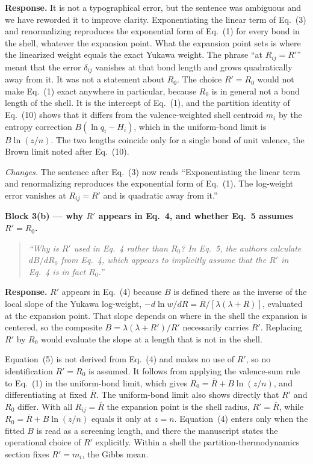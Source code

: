 \documentclass[11pt]{article}
\newenvironment{refquote}%
  {\begin{quote}\itshape\color{black!70}}%
  {\end{quote}}
\begin{document}
\textbf{Response.}  It is not a typographical error, but the sentence
was ambiguous and we have reworded it to improve clarity.  Exponentiating the linear
term of Eq.~(3) and renormalizing reproduces the exponential form of
Eq.~(1) for every bond in the shell, whatever the expansion point.
What the expansion point sets is where the linearized weight equals
the exact Yukawa weight.  The phrase ``at $R_{ij}=R'$'' meant that
the error $\delta_{ij}$ vanishes at that bond length and grows
quadratically away from it.  It was not a statement about $R_0$.
The choice $R'=R_0$ would not make Eq.~(1) exact anywhere in
particular, because $R_0$ is in general not a bond length of the
shell.  It is the intercept of Eq.~(1), and the partition identity of
Eq.~(10) shows that it differs from the valence-weighted shell
centroid $m_i$ by the entropy correction $B(\ln q_i-H_i)$, which in
the uniform-bond limit is $B\ln(z/n)$.  The two lengths coincide
only for a single bond of unit valence, the Brown limit noted after
Eq.~(10).

\emph{Changes.}  The sentence after Eq.~(3) now reads
``Exponentiating the linear term and renormalizing reproduces the
exponential form of Eq.~(1).  The log-weight error vanishes at
$R_{ij}=R'$ and is quadratic away from it.''

\textbf{Block 3(b) --- why $R'$ appears in Eq.~4, and whether Eq.~5
assumes $R'=R_0$.}

\begin{refquote}
``Why is $R'$ used in Eq.~4 rather than $R_0$?  In Eq.~5, the authors
calculate $dB/dR_0$ from Eq.~4, which appears to implicitly assume
that the $R'$ in Eq.~4 is in fact $R_0$.''
\end{refquote}

\textbf{Response.}  $R'$ appears in Eq.~(4) because $B$ is defined
there as the inverse of the local slope of the Yukawa log-weight,
$-d\ln w/dR=R/[\lambda(\lambda+R)]$, evaluated at the expansion
point.  That slope depends on where in the shell the expansion is
centered, so the composite $B=\lambda(\lambda+R')/R'$ necessarily
carries $R'$.  Replacing $R'$ by $R_0$ would evaluate the slope at a
length that is not in the shell.

Equation~(5) is not derived from Eq.~(4) and makes no use of $R'$,
so no identification $R'=R_0$ is assumed.  It follows from applying
the valence-sum rule to Eq.~(1) in the uniform-bond limit, which
gives $R_0=\bar R+B\ln(z/n)$, and differentiating at fixed
$\bar R$.  The uniform-bond limit also shows directly that $R'$ and
$R_0$ differ.  With all $R_{ij}=\bar R$ the expansion point is the
shell radius, $R'=\bar R$, while $R_0=\bar R+B\ln(z/n)$ equals it
only at $z=n$.  Equation~(4) enters only when the fitted $B$ is read
as a screening length, and there the manuscript states the
operational choice of $R'$ explicitly.  Within a shell the
partition-thermodynamics section fixes $R'=m_i$, the Gibbs mean.
\end{document}
